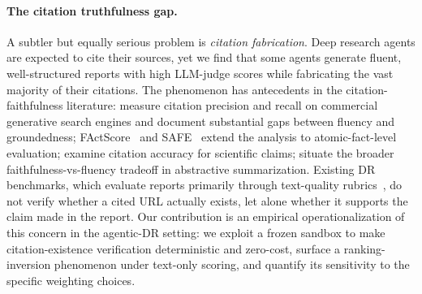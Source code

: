 \documentclass{article}
\begin{document}
\paragraph{The citation truthfulness gap.} A subtler but equally serious problem is \emph{citation fabrication}. Deep research agents are expected to cite their sources, yet we find that some agents generate fluent, well-structured reports with high LLM-judge scores while fabricating the vast majority of their citations. The phenomenon has antecedents in the citation-faithfulness literature: \citet{liu2023verifiability} measure citation precision and recall on commercial generative search engines and document substantial gaps between fluency and groundedness; FActScore~\citep{factscore2023} and SAFE~\citep{safe2024} extend the analysis to atomic-fact-level evaluation; \citet{citeme2024} examine citation accuracy for scientific claims; \citet{maynez2020faithfulness} situate the broader faithfulness-vs-fluency tradeoff in abstractive summarization. Existing DR benchmarks, which evaluate reports primarily through text-quality rubrics~\citep{draco2026,liveresearchbench2026,researchrubrics2025}, do not verify whether a cited URL actually exists, let alone whether it supports the claim made in the report. Our contribution is an empirical operationalization of this concern in the agentic-DR setting: we exploit a frozen sandbox to make citation-existence verification deterministic and zero-cost, surface a ranking-inversion phenomenon under text-only scoring, and quantify its sensitivity to the specific weighting choices.
\end{document}
